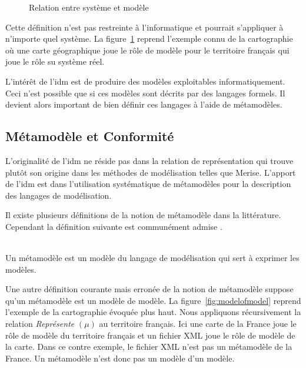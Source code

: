 \begin{figure}[!ht]
    \begin{center}
    
    \end{center}
    \caption{Relation entre système et modèle \protect\cite{favre2006ingenierie}}
    \label{fig:systemModele}
\end{figure}

Cette définition n'est pas restreinte à l'informatique et pourrait s'appliquer à 
n'importe quel système. 
La figure~\ref{fig:systemModele} reprend l'exemple connu de la cartographie où 
une carte géographique joue le rôle de modèle pour le territoire français qui joue le rôle su système réel.

L'intérêt de l'\gls{idm} est de produire des modèles exploitables informatiquement. 
Ceci n'est possible que si ces modèles sont décrits par des langages formels. Il 
devient alors important de bien définir ces langages à l'aide de métamodèles.

\subsection{Métamodèle et Conformité}
L'originalité de l'\gls{idm} ne réside pas dans la relation de représentation qui 
trouve plutôt son origine dans les méthodes de modélisation telles que Merise. L'apport de l'\gls{idm} est dans l'utilisation systématique de métamodèles pour la description des langages de modélisation. 

Il existe plusieurs définitions de la notion de métamodèle dans la littérature. 
Cependant la définition suivante est communément admise \cite{bezivin2004rapport}.
\\\

\begin{definition}
Un métamodèle est un modèle du langage de modélisation qui sert à exprimer les 
modèles.
\end{definition}

Une autre définition courante mais erronée de la notion de métamodèle suppose 
qu'un métamodèle est un modèle de modèle. La figure~\ref{fig:modelofmodel} 
reprend l'exemple de la cartographie évoquée plus haut. Nous appliquons 
récursivement la relation \textit{Représente} $(\mu)$ au territoire 
français. Ici une carte de la France joue le rôle de modèle du territoire 
français et un fichier XML joue le rôle de modèle de la carte. Dans ce contre 
exemple, le fichier XML n'est pas un métamodèle de la France. Un métamodèle 
n'est donc pas un modèle d'un modèle.

